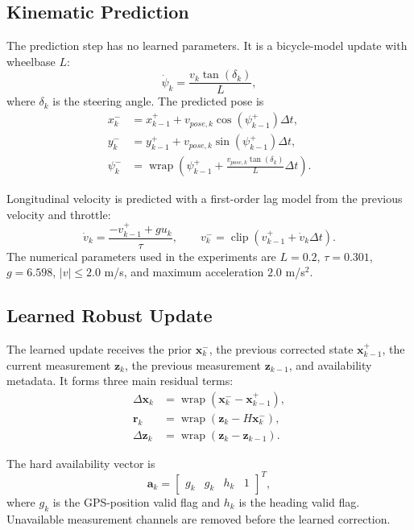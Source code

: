 \documentclass[11pt,a4paper]{article}
\newcommand{\state}{\bm{x}}
\newcommand{\meas}{\bm{z}}
\newcommand{\prior}{\state_k^-}
\newcommand{\avail}{\bm{a}}
\newcommand{\innov}{\bm{r}}
\newcommand{\wrap}{\operatorname{wrap}}
\begin{document}
\subsection{Kinematic Prediction}

The prediction step has no learned parameters. It is a bicycle-model update
with wheelbase $L$:
\begin{equation}
  \dot{\psi}_k =
  \frac{v_k\tan(\delta_k)}{L},
\end{equation}
where $\delta_k$ is the steering angle. The predicted pose is
\begin{align}
  x_k^- &= x_{k-1}^+ + v_{pose,k}\cos(\psi_{k-1}^+)\Delta t, \\
  y_k^- &= y_{k-1}^+ + v_{pose,k}\sin(\psi_{k-1}^+)\Delta t, \\
  \psi_k^- &=
  \wrap\left(\psi_{k-1}^+
  + \frac{v_{pose,k}\tan(\delta_k)}{L}\Delta t\right).
\end{align}

Longitudinal velocity is predicted with a first-order lag model from the
previous velocity and throttle:
\begin{equation}
  \dot{v}_k =
  \frac{-v_{k-1}^+ + g u_k}{\tau},
  \qquad
  v_k^- =
  \operatorname{clip}\left(v_{k-1}^+ + \dot{v}_k\Delta t\right).
\end{equation}
The numerical parameters used in the experiments are $L=0.2$, $\tau=0.301$,
$g=6.598$, $|v|\leq2.0$ m/s, and maximum acceleration $2.0$ m/s$^2$.

\subsection{Learned Robust Update}

The learned update receives the prior $\prior$, the previous corrected state
$\state_{k-1}^+$, the current measurement $\meas_k$, the previous measurement
$\meas_{k-1}$, and availability metadata. It forms three main residual terms:
\begin{align}
  \Delta \state_k &= \wrap(\state_k^- - \state_{k-1}^{+}), \\
  \innov_k &= \wrap(\meas_k - H\state_k^-), \\
  \Delta \meas_k &= \wrap(\meas_k - \meas_{k-1}).
\end{align}

The hard availability vector is
\begin{equation}
  \avail_k =
  \begin{bmatrix}
    g_k & g_k & h_k & 1
  \end{bmatrix}^{T},
\end{equation}
where $g_k$ is the GPS-position valid flag and $h_k$ is the heading valid flag.
Unavailable measurement channels are removed before the learned correction.
\end{document}
